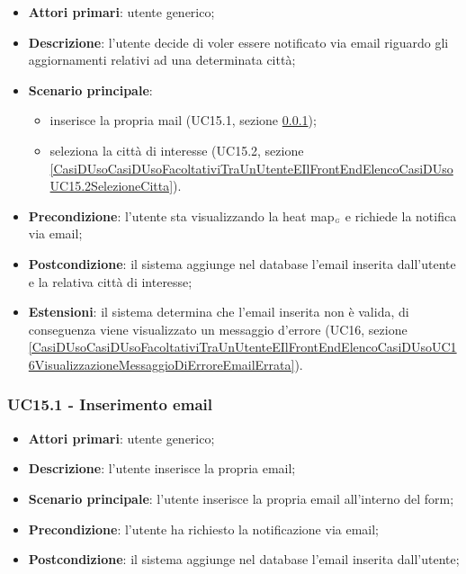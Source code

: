 \begin{itemize}
	\item \textbf{Attori primari}: utente generico;
	\item \textbf{Descrizione}: l'utente decide di voler essere notificato via email riguardo gli aggiornamenti relativi ad una determinata città;
	\item \textbf{Scenario principale}:
		\begin{itemize}
			\item inserisce la propria mail (UC15.1, sezione \ref{CasiDUsoCasiDUsoFacoltativiTraUnUtenteEIlFrontEndElencoCasiDUsoUC15.1InserimentoEmail});
			\item seleziona la città di interesse (UC15.2, sezione \ref{CasiDUsoCasiDUsoFacoltativiTraUnUtenteEIlFrontEndElencoCasiDUsoUC15.2SelezioneCitta}).
		\end{itemize}
	\item \textbf{Precondizione}: l'utente sta visualizzando la heat map$_{\scaleto{G}{3pt}}$ e richiede la notifica via email;
	\item \textbf{Postcondizione}: il sistema aggiunge nel database l'email inserita dall'utente e la relativa città di interesse;
	\item \textbf{Estensioni}: il sistema determina che l'email inserita non è valida, di conseguenza viene visualizzato un messaggio d'errore (UC16, sezione \ref{CasiDUsoCasiDUsoFacoltativiTraUnUtenteEIlFrontEndElencoCasiDUsoUC16VisualizzazioneMessaggioDiErroreEmailErrata}).
\end{itemize}

\subsubsection{UC15.1 - Inserimento email}\label{CasiDUsoCasiDUsoFacoltativiTraUnUtenteEIlFrontEndElencoCasiDUsoUC15.1InserimentoEmail}

\begin{itemize}
	\item \textbf{Attori primari}: utente generico;
	\item \textbf{Descrizione}: l'utente inserisce la propria email;
	\item \textbf{Scenario principale}: l'utente inserisce la propria email all'interno del form;
	\item \textbf{Precondizione}: l'utente ha richiesto la notificazione via email;
	\item \textbf{Postcondizione}: il sistema aggiunge nel database l'email inserita dall'utente;
\end{itemize}

